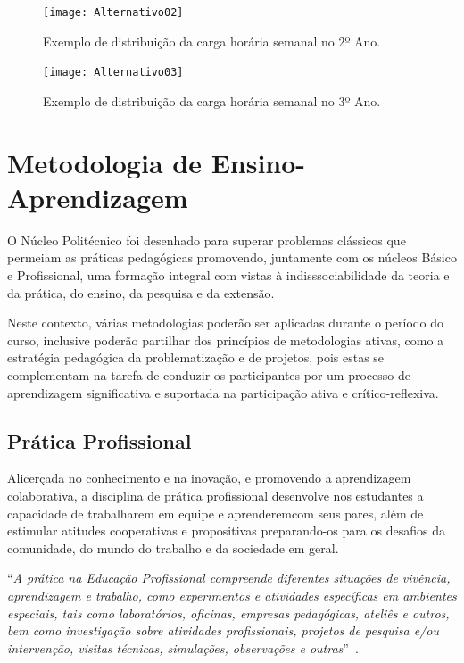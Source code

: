 \documentclass[11pt,fleqn]{book} %
\renewenvironment{quote}
{\small\list{}{\rightmargin=.1cm \leftmargin=2.5cm}%
	\item\relax}
{\endlist}
\begin{document}
\begin{figure}[!htp]
	\centering	
	\texttt{[image: Alternativo02]}
	\caption{Exemplo de distribuição da carga horária semanal no 2º Ano.}
	\label{fig:DiagramaSemanal02}
\end{figure}

\begin{figure}[!htp]
	\centering	
	\texttt{[image: Alternativo03]}
	\caption{Exemplo de distribuição da carga horária semanal no 3º Ano.}
	\label{fig:DiagramaSemanal03}
\end{figure}

\section{Metodologia de Ensino-Aprendizagem}\label{metodologia}
\indent

O Núcleo Politécnico foi desenhado para superar problemas clássicos que permeiam as práticas pedagógicas promovendo, juntamente com os núcleos Básico e Profissional, uma formação integral com vistas à indisssociabilidade da teoria e da prática, do ensino, da pesquisa e da extensão. 

Neste contexto, várias metodologias poderão ser aplicadas durante o período do curso, inclusive poderão partilhar dos princípios de metodologias ativas, como a estratégia pedagógica da problematização e de projetos, pois estas se complementam na tarefa de conduzir os participantes por um processo de aprendizagem significativa e suportada na participação ativa e crítico-reflexiva. 

\subsection{Prática Profissional}\label{praticasprofissionais}
\indent

Alicerçada no conhecimento e na inovação, e promovendo a aprendizagem colaborativa, a disciplina de prática profissional desenvolve nos estudantes a capacidade de trabalharem em equipe e aprenderemcom seus pares, além de estimular atitudes cooperativas e propositivas preparando-os para os desafios da comunidade, do mundo do trabalho e da sociedade em geral.

\begin{quote}
``\textit{A prática na Educação Profissional compreende diferentes situações de vivência, aprendizagem e trabalho, como experimentos e atividades específicas em ambientes especiais, tais como laboratórios, oficinas, empresas pedagógicas, ateliês e outros, bem como investigação sobre atividades profissionais, projetos de pesquisa e/ou intervenção, visitas técnicas, simulações, observações e outras}''~\cite{Resolucao06De2012}.
\end{quote}
\end{document}
